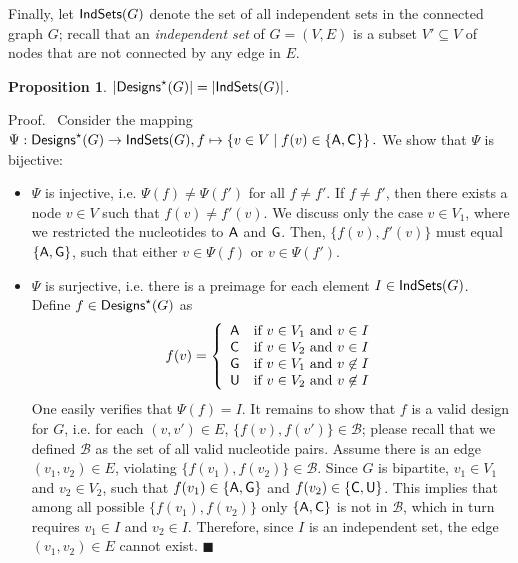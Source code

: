 \documentclass[]{bmcart}
\newtheorem{proposition}[theorem]{Proposition}
\newcommand*{\QEDA}{\hfill\ensuremath{\blacksquare}}%
\newenvironment{proof}[1][]{\noindent Proof\ifthenelse{\equal{#1}{}}{}{ (#1)}.~}{}
\newcommand{\B}{\mathcal{B}}
\newcommand{\Def}[1]{\emph{#1}}
\newcommand{\Design}[1]{{\sf Designs}^{\star}(#1)}
\newcommand{\IS}[1]{{\sf IndSets}(#1)}
\newcommand{\Nuc}[1]{{\sf #1}}
\newcommand{\Ab}{\Nuc{A}}
\newcommand{\Cb}{\Nuc{C}}
\newcommand{\Gb}{\Nuc{G}}
\newcommand{\Ub}{\Nuc{U}}
\begin{document}
Finally, let $\IS{G}$ denote the set of all independent sets in the connected graph $G$; recall that an \Def{independent set} of $G=(V,E)$ is a subset $V'\subseteq V$ of nodes that are not connected by any edge in $E$. 

\begin{proposition}\label{prop:bijection}
  $|\Design{G}| = |\IS{G}|$.
\end{proposition}
%
\begin{proof}
Consider the mapping $\Psi: \Design{G} \to \IS{G}, f \mapsto \left\{v\in V\mid f(v)\in\{\Ab,\Cb\}\right\}.$
We show that $\Psi$ is bijective:%
\begin{itemize}
\item $\Psi$ is injective, i.e. $\Psi(f)\neq\Psi(f')$ for all $f\neq f'$.
If $f\neq f'$, then there exists a node $v\in V$ such that $f(v)\neq f'(v)$.
We discuss only the case $v\in V_1$, where we restricted the nucleotides to $\Ab$ and $\Gb$. Then, $\{f(v),f'(v)\}$ must equal $\{\Ab,\Gb\}$, such that either $v\in\Psi(f)$ or $v\in\Psi(f')$.
%
\item $\Psi$ is surjective, i.e. there is a preimage for each element $I\in \IS{G}$. Define $f\in\Design{G}$ as\begin{displaymath}
f(v) = \left\{\begin{array}{ll} %
\Ab{} & \text{if $v\in V_1$ and $v\in I$} \\ %
\Cb{} & \text{if $v\in V_2$ and $v\in I$} \\
\Gb{} & \text{if $v\in V_1$ and $v\not\in I$} \\ %
\Ub{} & \text{if $v\in V_2$ and $v\not\in I$}
\end{array}\right.
\end{displaymath}
One easily verifies that $\Psi(f) = I$.
%
%
It remains to show that $f$ is a valid design for $G$, i.e. for each $(v, v') \in E$, $\{f(v),f(v')\}\in \B$; please recall that we defined $\B$ as the set of all valid nucleotide pairs.
Assume there is an edge $(v_1,v_2)\in E$, violating $\{f(v_1),f(v_2)\} \in \B$. Since $G$ is bipartite,
$v_1\in V_1$ and $v_2\in V_2$, such that $f(v_1)\in\{\Ab,\Gb\}$ and $f(v_2)\in\{\Cb,\Ub\}$. This implies that among all possible $\{f(v_1), f(v_2)\}$ only $\{\Ab,\Cb\}$ is not in $\B$, which in turn requires $v_1\in I$ and $v_2\in I$. Therefore, since $I$ is an independent set, the edge $(v_1,v_2)\in E$ cannot exist. \QEDA
\end{itemize}
\end{proof}
\end{document}

